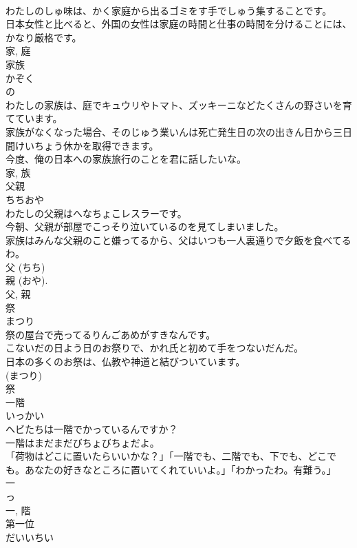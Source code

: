 \documentclass[8pt]{extreport}
\begin{document}
\begin{CJK}{UTF8}{min}
\\	わたしのしゅ味は、かく家庭から出るゴミをす手でしゅう集することです。	
\\	日本女性と比べると、外国の女性は家庭の時間と仕事の時間を分けることには、かなり厳格です。	
\\	家, 庭	
\\	家族	
\\	かぞく	
\\	の 
\\	わたしの家族は、庭でキュウリやトマト、ズッキーニなどたくさんの野さいを育てています。	
\\	家族がなくなった場合、そのじゅう業いんは死亡発生日の次の出きん日から三日間けいちょう休かを取得できます。	
\\	今度、俺の日本への家族旅行のことを君に話したいな。	
\\	家, 族	
\\	父親	
\\	ちちおや	
\\	わたしの父親はへなちょこレスラーです。	
\\	今朝、父親が部屋でこっそり泣いているのを見てしまいました。	
\\	家族はみんな父親のこと嫌ってるから、父はいつも一人裏通りで夕飯を食べてるわ。	
\\	父 (ちち) 
\\	親 (おや).
\\	父, 親	
\\	祭	
\\	まつり	
\\	祭の屋台で売ってるりんごあめがすきなんです。	
\\	こないだの日よう日のお祭りで、かれ氏と初めて手をつないだんだ。	
\\	日本の多くのお祭は、仏教や神道と結びついています。	
\\	(まつり) 
\\	祭	
\\	一階	
\\	いっかい	
\\	ヘビたちは一階でかっているんですか？	
\\	一階はまだまだびちょびちょだよ。	
\\	「荷物はどこに置いたらいいかな？」「一階でも、二階でも、下でも、どこでも。あなたの好きなところに置いてくれていいよ。」「わかったわ。有難う。」	
\\	一 
\\	っ 
\\	一, 階	
\\	第一位	
\\	だいいちい	

\end{CJK}
\end{document}
